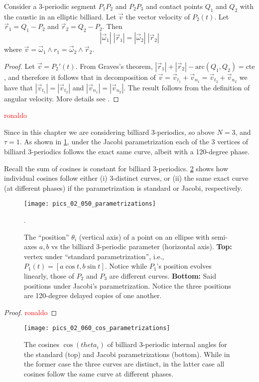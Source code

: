 \begin{proposition} 
Consider a 3-periodic segment $P_1P_2$ and $P_2P_3$  and contact points $Q_1$ and $Q_2$ with the caustic in an elliptic billiard. Let $\vec v$ the vector velocity of $P_2(t)$. Let $\vec r_1=Q_1-P_2$ and $\vec r_2=Q_2-P_2$. Then
\[ |\vec \omega_1|\;|\vec r_1|=|\vec \omega_2|\; |\vec r_2|\]
where $\vec v=\vec\omega_1\wedge r_1= \vec\omega_2\wedge \vec r_2$.

\label{fig:02-velocidade-angular}
\end{proposition}

\begin{proof} Let $\vec v=P_2'(t)$. From Graves's theorem, $|\vec r_1|+|\vec r_2|-\text{arc}(Q_1,Q_2)=\text{cte}$,  and therefore it follows that in decomposition of $\vec v=\vec v_{t_1}+\vec v_{n_1}=\vec v_{t_2}+\vec v_{n_2}$ we have that $|\vec v_{t_1}|=|\vec v_{t_2}|$ and  $|\vec v_{n_1}|=|\vec v_{n_2}|$. The result follows from the   definition of angular velocity. More details see \cite{stachel2021-billiards-param}.
\end{proof}
 
\textcolor{red}{ronaldo}
 
Since in this chapter we are considering billiard 3-periodics, so above $N=3$, and $\tau=1$. As shown in \cref{fig:02-jacobi-param}, under the Jacobi parametrization each of the 3 vertices of billiard 3-periodics follows the exact same curve, albeit with a 120-degree phase.

Recall the sum of cosines is constant for billiard 3-periodics. \cref{fig:02-jacobi-cos-param} shows how individual cosines follow either (i) 3-distinct curves, or (ii) the same exact curve (at different phases) if the parametrization is standard or Jacobi, respectively.

\begin{figure}
    \centering
    \texttt{[image: pics\_02\_050\_parametrizations]}
    \caption{The ``position'' $\theta_i$ (vertical axis) of a point on an ellipse with semi-axes $a,b$ vs the billiard 3-periodic parameter (horizontal axis). \textbf{Top:} vertex  under ``standard parametrization'', i.e., $P_1(t)=[a\cos{t},b\sin{t}]$. Notice while $P_1$'s position evolves linearly, those of $P_2$ and $P_3$ are different curves. \textbf{Bottom:} Said positions under Jacobi's parametrization. Notice the three positions are 120-degree delayed copies of one another.}. 
    \label{fig:02-jacobi-param}
\end{figure}

\begin{proof}
\textcolor{red}{ronaldo}
\end{proof}
\begin{figure}
    \centering
    \texttt{[image: pics\_02\_060\_cos\_parametrizations]}
    \caption{The cosines $\cos(theta_i)$ of billiard 3-periodic internal angles for the standard (top) and Jacobi parametrizations (bottom). While in the former case the three curves are distinct, in the latter case all cosines follow the same curve at different phases.}
    \label{fig:02-jacobi-cos-param}
\end{figure}
